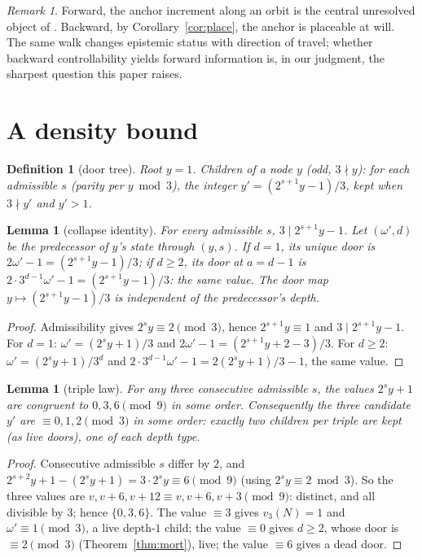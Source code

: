 \documentclass[11pt]{article}
\newtheorem{lemma}[theorem]{Lemma}
\newtheorem{definition}[theorem]{Definition}
\theoremstyle{remark}
\newtheorem{remark}[theorem]{Remark}
\newcommand{\vth}[1]{v_3\!\left(#1\right)}
\newcommand{\w}{\omega}
\begin{document}
\begin{remark}
Forward, the anchor increment along an orbit is the central unresolved object of \cite{paper1}. Backward, by Corollary~\ref{cor:place}, the anchor is placeable at will. The same walk changes epistemic status with direction of travel; whether backward controllability yields forward information is, in our judgment, the sharpest question this paper raises.
\end{remark}

\section{A density bound}\label{sec:density}

\begin{definition}[door tree]\label{def:doortree}
Root $y = 1$. Children of a node $y$ (odd, $3\nmid y$): for each admissible $s$ (parity per $y \bmod 3$), the integer $y' = (2^{s+1}y - 1)/3$, kept when $3\nmid y'$ and $y' > 1$.
\end{definition}

\begin{lemma}[collapse identity]\label{lem:collapse}
For every admissible $s$, $3 \mid 2^{s+1}y - 1$. Let $(\w', d)$ be the predecessor of $y$'s state through $(y,s)$. If $d = 1$, its unique door is $2\w' - 1 = (2^{s+1}y-1)/3$; if $d \ge 2$, its door at $a = d-1$ is $2\cdot3^{d-1}\w' - 1 = (2^{s+1}y-1)/3$: \emph{the same value}. The door map $y \mapsto (2^{s+1}y-1)/3$ is independent of the predecessor's depth.
\end{lemma}

\begin{proof}
Admissibility gives $2^s y \equiv 2 \pmod 3$, hence $2^{s+1}y \equiv 1$ and $3 \mid 2^{s+1}y - 1$. For $d = 1$: $\w' = (2^sy+1)/3$ and $2\w' - 1 = (2^{s+1}y + 2 - 3)/3$. For $d \ge 2$: $\w' = (2^sy+1)/3^d$ and $2\cdot3^{d-1}\w' - 1 = 2(2^sy+1)/3 - 1$, the same value.
\end{proof}

\begin{lemma}[triple law]\label{lem:triple}
For any three consecutive admissible $s$, the values $2^s y + 1$ are congruent to $0, 3, 6 \pmod 9$ in some order. Consequently the three candidate $y'$ are $\equiv 0, 1, 2 \pmod 3$ in some order: exactly two children per triple are kept (as live doors), one of each depth type.
\end{lemma}

\begin{proof}
Consecutive admissible $s$ differ by $2$, and $2^{s+2}y + 1 - (2^s y + 1) = 3\cdot2^s y \equiv 6 \pmod 9$ (using $2^s y \equiv 2 \bmod 3$). So the three values are $v, v+6, v+12 \equiv v, v+6, v+3 \pmod 9$: distinct, and all divisible by $3$; hence $\{0,3,6\}$. The value $\equiv 3$ gives $\vth N = 1$ and $\w' \equiv 1 \pmod 3$, a live depth-$1$ child; the value $\equiv 0$ gives $d \ge 2$, whose door is $\equiv 2 \pmod 3$ (Theorem~\ref{thm:mort}), live; the value $\equiv 6$ gives a dead door.
\end{proof}
\end{document}
